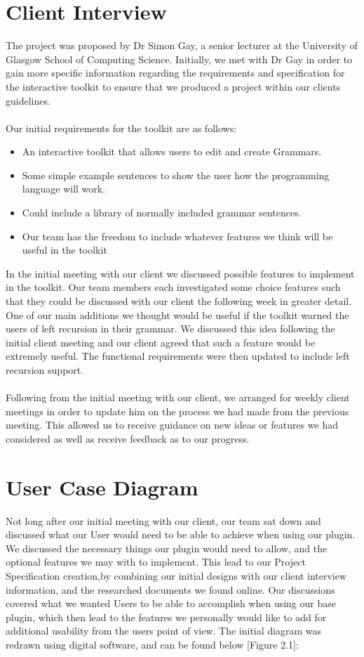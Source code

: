 \documentclass{l3proj}
\begin{document}
\section{Client Interview}
The project was proposed by Dr Simon Gay, a senior lecturer at the University of Glasgow School of Computing Science. Initially, we met with Dr Gay in order to gain more specific information regarding the requirements and specification for the interactive toolkit to ensure that we produced a project within our clients guidelines.\\
\\
Our initial requirements for the toolkit are as follows:
\begin{itemize}
	\item An interactive toolkit that allows users to edit and create Grammars.
	\item Some simple example sentences to show the user how the programming language will work.
	\item Could include a library of normally included grammar sentences.
	\item Our team has the freedom to include whatever features we think will be useful in the toolkit
\end{itemize}

In the initial meeting with our client we discussed possible features to implement in the toolkit. Our team members each investigated some choice features such that they could be discussed with our client the following week in greater detail. One of our main additions we thought would be useful if the toolkit warned the users of left recursion in their grammar. We discussed this idea following the initial client meeting and our client agreed that such a feature would be extremely useful. The functional requirements were then updated to include left recursion support.\\
\\
Following from the initial meeting with our client, we arranged for weekly client meetings in order to update him on the process we had made from the previous meeting. This allowed us to receive guidance on new ideas or features we had considered as well as receive feedback as to our progress. 

\section{User Case Diagram}
Not long after our initial meeting with our client, our team sat down and discussed what our User would need to be able to achieve when using our plugin. We discussed the necessary things our plugin would need to allow, and the optional features we may with to implement. This lead to our Project Specification creation,by combining our initial designs with our client interview information, and the researched documents we found online. Our discussions covered what we wanted Users to be able to accomplish when using our base plugin, which then lead to the features we personally would like to add for additional usability from the users point of view. The initial diagram was redrawn using digital software, and can be found below [Figure 2.1]:
\end{document}
